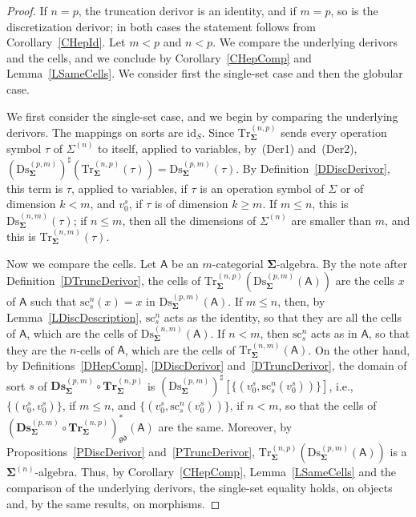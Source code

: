 \documentclass[a4paper, reqno
]{amsart}
\newcommand{\sig}[1]{\mathbf{#1}}             %
\newcommand{\calg}[1]{\boldsymbol{\mathsf{#1}}} %
\newcommand{\id}{\mathrm{id}}
\newcommand{\gd}{\mathfrak{gd}}              %
\newcommand{\src}{\mathrm{sc}}
\newcommand{\Ds}{\mathrm{Ds}}
\newcommand{\Tr}{\mathrm{Tr}}
\newcommand{\bDs}{\mathbf{Ds}}
\newcommand{\bTr}{\mathbf{Tr}}
\theoremstyle{plain}
\theoremstyle{definition}
\begin{document}
\begin{proof}
If $n=p$, the truncation derivor is an identity, and if $m=p$, so is the discretization derivor; in both cases the statement follows from Corollary~\ref{CHepId}.
Let $m<p$ and $n<p$.
We compare the underlying derivors and the cells, and we conclude by Corollary~\ref{CHepComp} and Lemma~\ref{LSameCells}.
We consider first the single-set case and then the globular case.

We first consider the single-set case, and we begin by comparing the underlying derivors.
The mappings on sorts are $\id_{S}$.
Since $\Tr^{(n,p)}_{\sig{\Sigma}}$ sends every operation symbol $\tau$ of $\Sigma^{(n)}$ to itself, applied to variables, by~(Der1) and~(Der2), $(\Ds^{(p,m)}_{\sig{\Sigma}})^{\sharp}(\Tr^{(n,p)}_{\sig{\Sigma}}(\tau))=\Ds^{(p,m)}_{\sig{\Sigma}}(\tau)$.
By Definition~\ref{DDiscDerivor}, this term is $\tau$, applied to variables, if $\tau$ is an operation symbol of $\Sigma$ or of dimension $k<m$, and $v^{s}_{0}$, if $\tau$ is of dimension $k\geq m$.
If $m\leq n$, this is $\Ds^{(n,m)}_{\sig{\Sigma}}(\tau)$; if $n\leq m$, then all the dimensions of $\Sigma^{(n)}$ are smaller than $m$, and this is $\Tr^{(n,m)}_{\sig{\Sigma}}(\tau)$.

Now we compare the cells.
Let $\calg{A}$ be an $m$-categorial $\sig{\Sigma}$-algebra.
By the note after Definition~\ref{DTruncDerivor}, the cells of $\Tr^{(n,p)}_{\sig{\Sigma}}(\Ds^{(p,m)}_{\sig{\Sigma}}(\calg{A}))$ are the cells $x$ of $\calg{A}$ such that $\src^{n}_{s}(x)=x$ in $\Ds^{(p,m)}_{\sig{\Sigma}}(\calg{A})$.
If $m\leq n$, then, by Lemma~\ref{LDiscDescription}, $\src^{n}_{s}$ acts as the identity, so that they are all the cells of $\calg{A}$, which are the cells of $\Ds^{(n,m)}_{\sig{\Sigma}}(\calg{A})$.
If $n<m$, then $\src^{n}_{s}$ acts as in $\calg{A}$, so that they are the $n$-cells of $\calg{A}$, which are the cells of $\Tr^{(n,m)}_{\sig{\Sigma}}(\calg{A})$.
On the other hand, by Definitions~\ref{DHepComp}, \ref{DDiscDerivor} and~\ref{DTruncDerivor}, the domain of sort $s$ of $\bDs^{(p,m)}_{\sig{\Sigma}}\circ\bTr^{(n,p)}_{\sig{\Sigma}}$ is $(\Ds^{(p,m)}_{\sig{\Sigma}})^{\sharp}[\{(v^{s}_{0},\src^{n}_{s}(v^{s}_{0}))\}]$, i.e., $\{(v^{s}_{0},v^{s}_{0})\}$, if $m\leq n$, and $\{(v^{s}_{0},\src^{n}_{s}(v^{s}_{0}))\}$, if $n<m$, so that the cells of $(\bDs^{(p,m)}_{\sig{\Sigma}}\circ\bTr^{(n,p)}_{\sig{\Sigma}})^{\ast}_{\gd}(\calg{A})$ are the same.
Moreover, by Propositions~\ref{PDiscDerivor} and~\ref{PTruncDerivor}, $\Tr^{(n,p)}_{\sig{\Sigma}}(\Ds^{(p,m)}_{\sig{\Sigma}}(\calg{A}))$ is a $\sig{\Sigma}^{(n)}$-algebra.
Thus, by Corollary~\ref{CHepComp}, Lemma~\ref{LSameCells} and the comparison of the underlying derivors, the single-set equality holds, on objects and, by the same results, on morphisms.


\end{proof}
\end{document}
